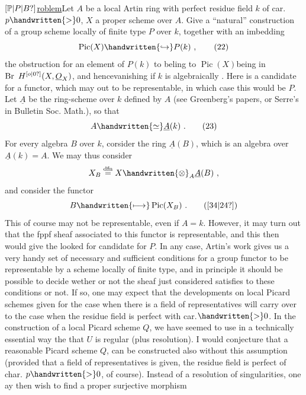\uline{$[\mathbb{P}|P|B?]$roblem}\quad Let $A$ be a local Artin ring with perfect residue field $k$ of car. $p\handwritten{>}0$, $X$ a proper scheme over $A$. Give a ``natural'' construction of a group scheme locally of finite type $P$ over $k$, together with an imbedding
\[
\operatorname{Pic}(X)\handwritten{\hookrightarrow}P(k)\ ,
\tag*{(22)}
\]
the obstruction for an element of $P(k)$ to beling to $\operatorname{Pic}(X)$\handwritten{(}being in $\operatorname{Br}\ H^{\unsure{o|0}}(X,\underline{O}_X)$, and hence\handwritten{)}vanishing if $k$ is algebraically .
Here is a candidate for a functor, which may  out to be representable, in which case this would be $P$. Let $\underline{A}$ be the ring-scheme over $k$ defined by $A$ (see Greenberg's papers, or Serre's in Bulletin Soc. Math.), so that
\[
A\handwritten{\simeq}\underline{A}(k)\ .
\tag*{(23)}
\]
For every algebra $B$ over $k$, corsider the ring $\underline{A}(B)$, which is an algebra over $\underline{A}(k)=A$. We may thus consider
\[
X_B\overset{\mathrm{dfn}}{=}X\handwritten{\otimes}_A\underline{A}(B)\ ,
\]
and consider the functor
\[
B\handwritten{\longmapsto}\operatorname{Pic}(X_B)\ .
\tag*{(\unsure{34|24})}
\]
This of course may not be representable, even if $A=k$. However, it may turn out that the fppf sheaf associated to this functor is representable, and this then would give the looked for candidate for $P$. In any case, Artin's work gives us a very handy set of necessary and sufficient conditions for a group functor to be representable by a scheme locally of finite type, and in principle it should be possible to decide wether or not the  sheaf just considered satisfies to these conditions or not. If so, one may expect that the developments on local Picard schemes given for the case when there is a field of representatives will carry over to the case when the residue field is perfect with car.$\handwritten{>}0$.
In the construction of a local Picard scheme $Q$, we have seemed to use in a technically essential way the   that $U$ is regular (plus resolution). I would conjecture that a reasonable  Picard scheme $Q$,  can be constructed also without this assumption (provided that a field of representatives is given,  the residue field is perfect of char. $p\handwritten{>}0$, of course). Instead of a resolution of singularities, one ay then wish to find a proper surjective morphism
